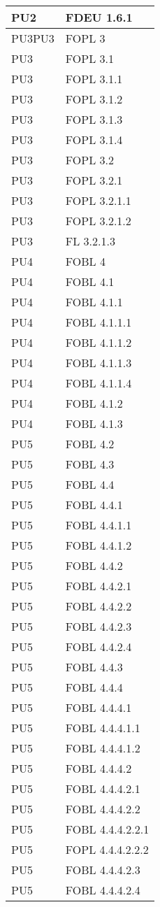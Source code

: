 \begin{longtable}{XX}
PU2&FDEU 1.6.1\\ 
\midrule 
PU3PU3&FOPL 3\\ 
PU3&FOPL 3.1\\ 
PU3&FOPL 3.1.1\\ 
PU3&FOPL 3.1.2\\ 
PU3&FOPL 3.1.3\\ 
PU3&FOPL 3.1.4\\ 
PU3&FOPL 3.2\\ 
PU3&FOPL 3.2.1\\ 
PU3&FOPL 3.2.1.1\\ 
PU3&FOPL 3.2.1.2\\ 
PU3&FL 3.2.1.3\\ 
\midrule 
PU4&FOBL 4\\ 
PU4&FOBL 4.1\\ 
PU4&FOBL 4.1.1\\ 
PU4&FOBL 4.1.1.1\\ 
PU4&FOBL 4.1.1.2\\ 
PU4&FOBL 4.1.1.3\\ 
PU4&FOBL 4.1.1.4\\ 
PU4&FOBL 4.1.2\\ 
PU4&FOBL 4.1.3\\ 
\midrule 
PU5&FOBL 4.2\\ 
PU5&FOBL 4.3\\ 
PU5&FOBL 4.4\\ 
PU5&FOBL 4.4.1\\ 
PU5&FOBL 4.4.1.1\\ 
PU5&FOBL 4.4.1.2\\ 
PU5&FOBL 4.4.2\\ 
PU5&FOBL 4.4.2.1\\ 
PU5&FOBL 4.4.2.2\\ 
PU5&FOBL 4.4.2.3\\ 
PU5&FOBL 4.4.2.4\\ 
PU5&FOBL 4.4.3\\ 
PU5&FOBL 4.4.4\\ 
PU5&FOBL 4.4.4.1\\ 
PU5&FOBL 4.4.4.1.1\\ 
PU5&FOBL 4.4.4.1.2\\ 
PU5&FOBL 4.4.4.2\\ 
PU5&FOBL 4.4.4.2.1\\ 
PU5&FOBL 4.4.4.2.2\\ 
PU5&FOBL 4.4.4.2.2.1\\ 
PU5&FOPL 4.4.4.2.2.2\\ 
PU5&FOBL 4.4.4.2.3\\ 
PU5&FOBL 4.4.4.2.4\\ 

\end{longtable}
